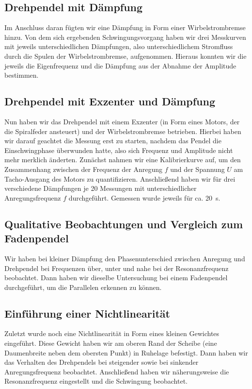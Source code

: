 \documentclass[
	a4paper,
	12pt,
	pagesize,
	ngerman
]{scrartcl}
\begin{document}
	\subsection{Drehpendel mit Dämpfung}
	Im Anschluss daran fügten wir eine Dämpfung in Form einer Wirbelstrombremse hinzu. Von dem sich ergebenden Schwingungsvorgang haben wir drei Messkurven mit jeweils unterschiedlichen Dämpfungen, also unterschiedlichem Stromfluss durch die Spulen der Wirbelstrombremse, aufgenommen. Hieraus konnten wir die jeweils die Eigenfrequenz und die Dämpfung aus der Abnahme der Amplitude bestimmen. %
	\subsection{Drehpendel mit Exzenter und Dämpfung} 
	Nun haben wir das Drehpendel mit einem Exzenter (in Form eines Motors, der die Spiralfeder ansteuert) und der Wirbelstrombremse betrieben. Hierbei haben wir darauf geachtet die Messung erst zu starten, nachdem das Pendel die Einschwingphase überwunden hatte, also sich Frequenz und Amplitude nicht mehr merklich änderten.
	Zunächst nahmen wir eine Kalibrierkurve auf, um den Zusammenhang zwischen der Frequenz der Anregung $ f $ und der Spannung $ U $ am Tacho-Ausgang des Motors zu quantifizieren.
	Anschließend haben wir für drei verschiedene Dämpfungen je 20 Messungen mit unterschiedlicher Anregungsfrequenz $ f $ durchgeführt. Gemessen wurde jeweils für ca. \SI{20}{\second}. 
	\subsection{Qualitative Beobachtungen und Vergleich zum Fadenpendel}
	Wir haben bei kleiner Dämpfung den Phasenunterschied zwischen Anregung und Drehpendel bei Frequenzen über, unter und nahe bei der Resonanzfrequenz beobachtet. Dann haben wir dieselbe Untersuchung bei einem Fadenpendel durchgeführt, um die Parallelen erkennen zu können.
	\subsection{Einführung einer Nichtlinearität}
	Zuletzt wurde noch eine Nichtlinearität in Form eines kleinen Gewichtes eingeführt. Diese Gewicht haben wir am oberen Rand der Scheibe (eine Daumenbreite neben dem obersten Punkt) in Ruhelage befestigt. Dann haben wir das Verhalten des Drehpendels bei steigender sowie bei sinkender Anregungsfrequenz beobachtet. Anschließend haben wir näherungsweise die Resonanzfrequenz eingestellt und die Schwingung beobachtet.
	
\end{document}
